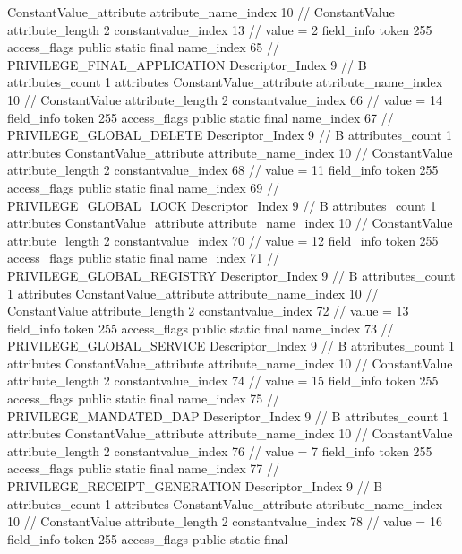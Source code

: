 {{{{{{				ConstantValue_attribute {
					attribute_name_index	10		// ConstantValue
					attribute_length	2
					constantvalue_index	13		// value = 2
				}
				}
			}
			field_info {
				token	255
				access_flags	public static final
				name_index	65		// PRIVILEGE_FINAL_APPLICATION
				Descriptor_Index	9		// B
				attributes_count	1
				attributes {
				ConstantValue_attribute {
					attribute_name_index	10		// ConstantValue
					attribute_length	2
					constantvalue_index	66		// value = 14
				}
				}
			}
			field_info {
				token	255
				access_flags	public static final
				name_index	67		// PRIVILEGE_GLOBAL_DELETE
				Descriptor_Index	9		// B
				attributes_count	1
				attributes {
				ConstantValue_attribute {
					attribute_name_index	10		// ConstantValue
					attribute_length	2
					constantvalue_index	68		// value = 11
				}
				}
			}
			field_info {
				token	255
				access_flags	public static final
				name_index	69		// PRIVILEGE_GLOBAL_LOCK
				Descriptor_Index	9		// B
				attributes_count	1
				attributes {
				ConstantValue_attribute {
					attribute_name_index	10		// ConstantValue
					attribute_length	2
					constantvalue_index	70		// value = 12
				}
				}
			}
			field_info {
				token	255
				access_flags	public static final
				name_index	71		// PRIVILEGE_GLOBAL_REGISTRY
				Descriptor_Index	9		// B
				attributes_count	1
				attributes {
				ConstantValue_attribute {
					attribute_name_index	10		// ConstantValue
					attribute_length	2
					constantvalue_index	72		// value = 13
				}
				}
			}
			field_info {
				token	255
				access_flags	public static final
				name_index	73		// PRIVILEGE_GLOBAL_SERVICE
				Descriptor_Index	9		// B
				attributes_count	1
				attributes {
				ConstantValue_attribute {
					attribute_name_index	10		// ConstantValue
					attribute_length	2
					constantvalue_index	74		// value = 15
				}
				}
			}
			field_info {
				token	255
				access_flags	public static final
				name_index	75		// PRIVILEGE_MANDATED_DAP
				Descriptor_Index	9		// B
				attributes_count	1
				attributes {
				ConstantValue_attribute {
					attribute_name_index	10		// ConstantValue
					attribute_length	2
					constantvalue_index	76		// value = 7
				}
				}
			}
			field_info {
				token	255
				access_flags	public static final
				name_index	77		// PRIVILEGE_RECEIPT_GENERATION
				Descriptor_Index	9		// B
				attributes_count	1
				attributes {
				ConstantValue_attribute {
					attribute_name_index	10		// ConstantValue
					attribute_length	2
					constantvalue_index	78		// value = 16
				}
				}
			}
			field_info {
				token	255
				access_flags	public static final
}}}}}
